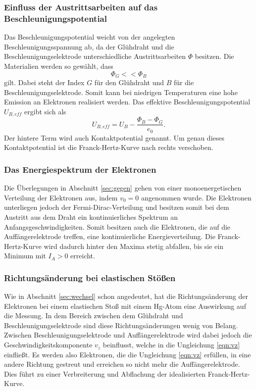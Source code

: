 \subsubsection*{Einfluss der Austrittsarbeiten auf das Beschleunigungspotential}
Das Beschleunigungspotential weicht von der angelegten Beschleunigungsspannung ab, da der Glühdraht und die Beschleunigungselektrode
unterschiedliche Austrittsarbeiten $\Phi$ besitzen. Die Materialien werden so gewählt, dass
\begin{equation*}
    \Phi_G<<\Phi_B
\end{equation*}
gilt. Dabei steht der Index $G$ für den Glühdraht und $B$ für die Beschleunigungselektrode. Somit kann bei niedrigen
Temperaturen eine hohe Emission an Elektronen realisiert werden. Das effektive Beschleunigungspotential $U_{B,eff}$ ergibt sich als
\begin{equation}
    U_{B,eff}=U_B-\frac{\Phi_B-\Phi_G}{e_0} .
    \label{eqn:effpottheorie}
\end{equation}
Der hintere Term wird auch Kontaktpotential genannt. Um genau dieses Kontaktpotential ist die Franck-Hertz-Kurve nach rechts verschoben.

\subsubsection*{Das Energiespektrum der Elektronen}
\label{sec:fermidirac}
Die Überlegungen in Abschnitt \ref{sec:gegen} gehen von einer monoenergetischen Verteilung der Elektronen aus, indem $v_0=0$ angenommen
wurde. Die Elektronen unterliegen jedoch der Fermi-Dirac-Verteilung und besitzen somit bei dem Austritt aus dem Draht ein kontinuierliches
Spektrum an Anfangsgeschwindigkeiten. Somit besitzen auch die Elektronen, die auf die Auffängerelektrode treffen, eine kontinuierliche
Energieverteilung. Die Franck-Hertz-Kurve wird dadurch hinter den Maxima stetig abfallen, bis sie ein Minimum mit $I_A>0$ erreicht.

\subsubsection*{Richtungsänderung bei elastischen Stößen}
Wie in Abschnitt \ref{sec:wechsel} schon angedeutet, hat die Richtungsänderung der Elektronen bei einem elastischen Stoß mit einem Hg-Atom
eine Auswirkung auf die Messung. In dem Bereich zwischen dem Glühdraht und Beschleunigungselektrode sind diese Richtungsänderungen
wenig von Belang. Zwischen Beschleunigungselektrode und Auffängerelektrode wird dabei jedoch die Geschwindigkeitskomponente $v_z$ beinflusst,
welche in die Ungleichung \eqref{eqn:vz} einfließt. Es werden also Elektronen, die die Ungleichung \eqref{eqn:vz} erfüllen, in eine andere
Richtung gestreut und erreichen so nicht mehr die Auffängerelektrode. Dies führt zu einer Verbreiterung und Abflachung der idealisierten
Franck-Hertz-Kurve.

